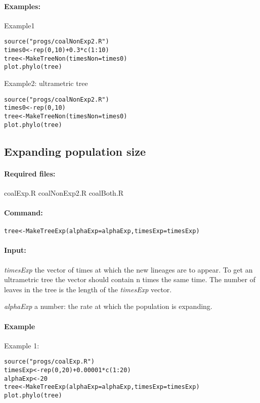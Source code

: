 \documentclass[12pt,a4paper]{article}
\begin{document}
\paragraph{Examples:}

Example1

\begin{verbatim}
source("progs/coalNonExp2.R")
times0<-rep(0,10)+0.3*c(1:10)
tree<-MakeTreeNon(timesNon=times0)
plot.phylo(tree)
\end{verbatim}

Example2: ultrametric tree

\begin{verbatim}
source("progs/coalNonExp2.R")
times0<-rep(0,10)
tree<-MakeTreeNon(timesNon=times0)
plot.phylo(tree)
\end{verbatim}


\subsection{Expanding population size}
\paragraph{Required files:} coalExp.R coalNonExp2.R coalBoth.R
\paragraph{Command:}
\verb!tree<-MakeTreeExp(alphaExp=alphaExp,timesExp=timesExp)!

\paragraph{Input:} 
\textit{timesExp} the vector of times at which the new lineages are to appear. To get an ultrametric tree the vector should contain n times the same time. The number of leaves in the tree is the length of the \textit{timesExp} vector.

\textit{alphaExp} a number: the rate at which the population is expanding.

\paragraph{Example}

Example 1:

\begin{verbatim}
source("progs/coalExp.R")
timesExp<-rep(0,20)+0.00001*c(1:20)
alphaExp<-20
tree<-MakeTreeExp(alphaExp=alphaExp,timesExp=timesExp)
plot.phylo(tree)
\end{verbatim}
\end{document}
